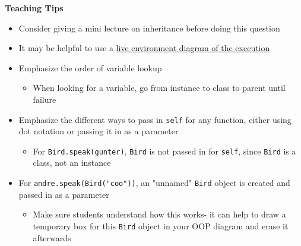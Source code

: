 \begin{blocksection}
\begin{guide}
\textbf{Teaching Tips}
\begin{itemize}
\item Consider giving a mini lecture on inheritance before doing this question
\item It may be helpful to use a \href{https://goo.gl/KkFr9F}{live environment diagram of the execution}
\item Emphasize the order of variable lookup
\begin{itemize}
  \item When looking for a variable, go from instance to class to parent until failure
\end{itemize}
\item Emphasize the different ways to pass in \lstinline{self} for any function, either using dot notation or passing it in as a parameter
\begin{itemize}
  \item For \lstinline{Bird.speak(gunter)}, \lstinline{Bird} is not passed in for \lstinline{self}, since \lstinline{Bird} is a class, not an instance
\end{itemize}
\item For \lstinline{andre.speak(Bird("coo"))}, an "unnamed" \lstinline{Bird} object is created and passed in as a parameter
\begin{itemize}
  \item Make sure students understand how this works- it can help to draw a temporary box for this \lstinline{Bird} object in your OOP diagram and erase it afterwards
\end{itemize}
\end{itemize}
\end{guide}
\end{blocksection}
